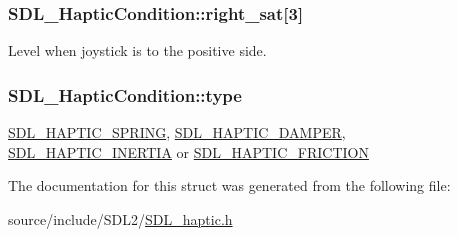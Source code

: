 \subsubsection[{right\+\_\+sat}]{ S\+D\+L\+\_\+\+Haptic\+Condition\+::right\+\_\+sat\mbox{[}3\mbox{]}}\label{struct_s_d_l___haptic_condition_a90427a1e0d464b4b53abc1d419c97b2e}
Level when joystick is to the positive side. \hypertarget{struct_s_d_l___haptic_condition_a7be55a9a86c05dd1a54a3006781cfa6f}{}
\subsubsection[{type}]{ S\+D\+L\+\_\+\+Haptic\+Condition\+::type}\label{struct_s_d_l___haptic_condition_a7be55a9a86c05dd1a54a3006781cfa6f}
\hyperlink{_s_d_l__haptic_8h_a3b52d4700380085e2b5d87bb20320fb1}{S\+D\+L\+\_\+\+H\+A\+P\+T\+I\+C\+\_\+\+S\+P\+R\+I\+N\+G}, \hyperlink{_s_d_l__haptic_8h_a69522f261973e3ea4273486141320a87}{S\+D\+L\+\_\+\+H\+A\+P\+T\+I\+C\+\_\+\+D\+A\+M\+P\+E\+R}, \hyperlink{_s_d_l__haptic_8h_a14b807471589120395aec28293cf6642}{S\+D\+L\+\_\+\+H\+A\+P\+T\+I\+C\+\_\+\+I\+N\+E\+R\+T\+I\+A} or \hyperlink{_s_d_l__haptic_8h_a98a5011311168d63921aaac21403a4d8}{S\+D\+L\+\_\+\+H\+A\+P\+T\+I\+C\+\_\+\+F\+R\+I\+C\+T\+I\+O\+N} 

The documentation for this struct was generated from the following file\+:\begin{DoxyCompactItemize}
\item 
source/include/\+S\+D\+L2/\hyperlink{_s_d_l__haptic_8h}{S\+D\+L\+\_\+haptic.\+h}\end{DoxyCompactItemize}
